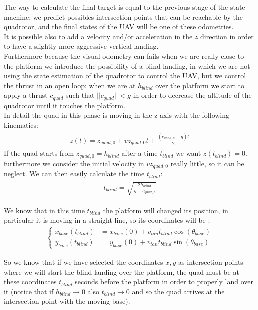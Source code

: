 The way to calculate the final target is equal to the previous stage of the state machine: we predict possibles intersection points that can be reachable by the quadrotor, and the final states of the UAV will be one of these odometries.\\
It is possible also to add a velocity and/or acceleration in the $z$ direction in order to have a slightly more aggressive vertical landing.\\
Furthermore because the visual odometry can fails when we are really close to the platform we introduce the possibility of a blind landing, in which we are not using the state estimation of the quadrotor to control the UAV, but we control the thrust in an open loop: when we are at $h_{blind}$ over the platform we start to apply a thrust $c_{quad}$ such that $||c_{quad}|| < g$ in order to decrease the altitude of the quadrotor until it touches the platform.\\
In detail the quad in this phase is moving in the z axis with the following kinematics:
\begin{align}
\begin{split}
z(t) = z_{quad,0} + vz_{quad,0}t + \frac{(c_{quad,z} - g)t}{2}
\label{eq:z_dynamics}
\end{split}
\end{align}
If the quad starts from $z_{quad,0} = h_{blind}$ after a time $t_{blind}$ we want $z(t_{blind}) = 0$. furthermore we consider the initial velocity in $vz_{quad,0}$ really little, so it can be neglect. We can then easily calculate the time $t_{blind}$:
\begin{align}
\begin{split}
t_{blind} = \sqrt{\frac{2h_{blind}}{g-c_{quad,z}}}
\label{eq:z_dynamics}
\end{split}
\end{align}

We know that in this time $t_{blind}$ the platform will changed its position, in particular it is moving in a straight line, so its coordinates will be :
\begin{align}
\begin{cases}
x_{base}(t_{blind}) &= x_{base}(0) + v_{tan}t_{blind}\cos{(\theta_{base})}\\[5pt]
y_{base}(t_{blind}) &= y_{base}(0) + v_{tan}t_{blind}\sin{(\theta_{base})}
\end{cases}
\label{eq:future_pose_blind}
\end{align}

So we know that if we have selected the coordinates $\tilde{x},\tilde{y}$ as intersection points where we will start the blind landing over the platform, the quad must be at these coordinates $t_{blind}$ seconds before the platform in order to properly land over it (notice that if $h_{blind} \rightarrow 0$ also $t_{blind} \rightarrow 0$ and so the quad arrives at the intersection point with the moving base).\\

